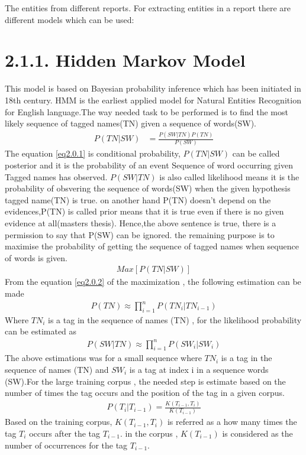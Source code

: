 The entities from different reports.
For extracting entities in a report there are different models which can be used:

\section*{2.1.1. Hidden Markov Model}
This model is based on Bayesian probability inference which has been initiated in 18th century. HMM is the earliest applied model for Natural Entities Recognition for English language.The way needed task to be performed is to find the most likely sequence of tagged names(TN) given a sequence of words(SW).
\begin{align}
P(TN|SW) & = \frac{P(SW|TN)P(TN)}{P(SW)}\label{eq2.0.1}
\end{align}
The equation  \eqref{eq2.0.1} is conditional probability, $P(TN|SW)$ can be  called posterior and it is  the probability of an event Sequence of word occurring given Tagged names has observed. 
$P(SW|TN)$ is also called likelihood means it is the probability of obsvering the sequence of words(SW) when the given hypothesis tagged name(TN) is true. on another hand P(TN) doesn't depend on the evidences,P(TN) is called prior means that it is true even if there is no given evidence at all(masters thesis).
Hence,the above sentence is true, there is a permission to say  that P(SW) can be ignored. the remaining purpose is to maximise the probability of getting the sequence of tagged names when sequence of words is given.
\begin{align}
Max\left[P(TN|SW)\right] \label{eq2.0.2}
\end{align}
From the equation  \eqref{eq2.0.2} of the maximization , the following estimation can be made
\begin{align}
P(TN){\approx} \prod_{i=1}^{n} P({TN}_{i}|{TN}_{i-1}) \label{2.0.3}
\end{align}
Where ${TN}_{i}$ is a tag in the sequence of names (TN) , for the likelihood probability can be estimated as 
\begin{align}
P(SW|TN){\approx} \prod_{i=1}^{n} P({SW}_{i}|{SW}_{i})\label{2.0.4}
\end{align}
The above estimations was for a small sequence where ${TN}_{i}$ is a tag in the sequence of names (TN) and ${SW}_{i}$ is a tag at index i in a sequence words (SW).For the large training corpus , the needed step is estimate based on the number of times the tag occurs and the position of the tag in a given corpus.
\begin{align}
P(T_{i}|T_{i-1}) = \frac{K(T_{i-1},T_{i})}{K(T_{i-1})}\label{2.0.5}
\end{align}
Based on the training corpus, $K(T_{i-1},T_{i})$ is referred as a how many times the tag $T_{i}$ occurs after the tag $T_{i-1}$. in the corpus , $K(T_{i-1})$ is considered as the number of occurrences for the tag $T_{i-1}$.

